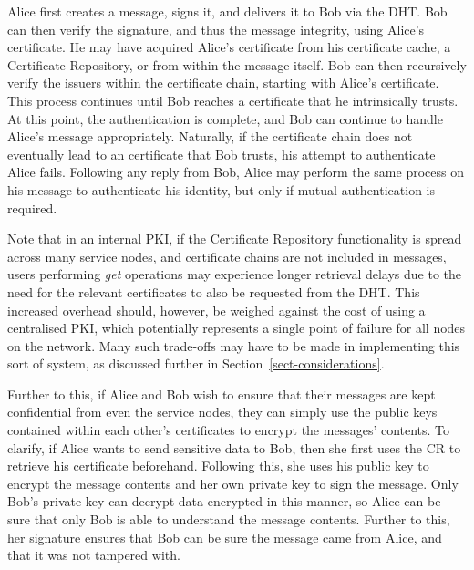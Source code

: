 \documentclass{elsart3p}
\begin{document}
Alice first creates a message, signs it, and delivers it to Bob via
the DHT. Bob can then verify the signature, and thus the message
integrity, using Alice's certificate. He may have acquired Alice's
certificate from his certificate cache, a Certificate Repository, or
from within the message itself. Bob can then recursively verify the
issuers within the certificate chain, starting with Alice's
certificate. This process continues until Bob reaches a certificate
that he intrinsically trusts. At this point, the authentication is
complete, and Bob can continue to handle Alice's message
appropriately. Naturally, if the certificate chain does not
eventually lead to an certificate that Bob trusts, his attempt to
authenticate Alice fails. Following any reply from Bob, Alice may
perform the same process on his message to authenticate his
identity, but only if mutual authentication is required.

Note that in an internal PKI, if the Certificate Repository
functionality is spread across many service nodes, and certificate
chains are not included in messages, users performing \emph{get}
operations may experience longer retrieval delays due to the need
for the relevant certificates to also be requested from the DHT.
This increased overhead should, however, be weighed against the cost
of using a centralised PKI, which potentially represents a single
point of failure for all nodes on the network. Many such trade-offs
may have to be made in implementing this sort of system, as
discussed further in Section~\ref{sect-considerations}.

Further to this, if Alice and Bob wish to ensure that their messages
are kept confidential from even the service nodes, they can simply
use the public keys contained within each other's certificates to
encrypt the messages' contents. To clarify, if Alice wants to send
sensitive data to Bob, then she first uses the CR to retrieve his
certificate beforehand. Following this, she uses his public key to
encrypt the message contents and her own private key to sign the
message. Only Bob's private key can decrypt data encrypted in this
manner, so Alice can be sure that only Bob is able to understand the
message contents. Further to this, her signature ensures that Bob
can be sure the message came from Alice, and that it was not
tampered with.
\end{document}
